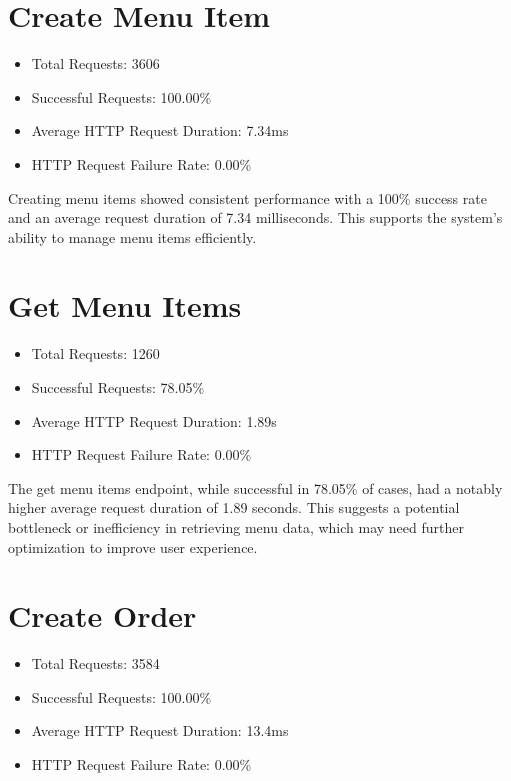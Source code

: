 \documentclass{article}
\begin{document}
\section{Create Menu Item}

\begin{itemize}
  \item Total Requests: 3606
  \item Successful Requests: 100.00\%
  \item Average HTTP Request Duration: 7.34ms
  \item HTTP Request Failure Rate: 0.00\%
\end{itemize}

Creating menu items showed consistent performance with a 100\% success rate and an average request duration of 7.34 milliseconds. This supports the system's ability to manage menu items efficiently.

\section{Get Menu Items}

\begin{itemize}
  \item Total Requests: 1260
  \item Successful Requests: 78.05\%
  \item Average HTTP Request Duration: 1.89s
  \item HTTP Request Failure Rate: 0.00\%
\end{itemize}

The get menu items endpoint, while successful in 78.05\% of cases, had a notably higher average request duration of 1.89 seconds. This suggests a potential bottleneck or inefficiency in retrieving menu data, which may need further optimization to improve user experience.

\section{Create Order}

\begin{itemize}
  \item Total Requests: 3584
  \item Successful Requests: 100.00\%
  \item Average HTTP Request Duration: 13.4ms
  \item HTTP Request Failure Rate: 0.00\%
\end{itemize}
\end{document}
